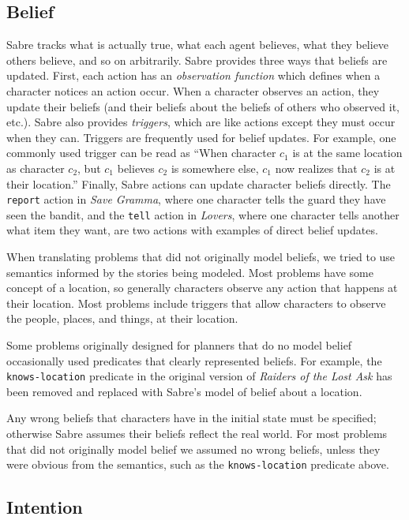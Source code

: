 \documentclass{nilreport}
\begin{document}
\subsection{Belief}

Sabre tracks what is actually true, what each agent believes, what
they believe others believe, and so on arbitrarily. Sabre provides
three ways that beliefs are updated. First, each action has an \emph{observation
function} which defines when a character notices an action occur.
When a character observes an action, they update their beliefs (and
their beliefs about the beliefs of others who observed it, etc.).
Sabre also provides \emph{triggers}, which are like actions except
they must occur when they can. Triggers are frequently used for belief
updates. For example, one commonly used trigger can be read as ``When
character $c_{1}$ is at the same location as character $c_{2}$,
but $c_{1}$ believes $c_{2}$ is somewhere else, $c_{1}$ now realizes
that $c_{2}$ is at their location.'' Finally, Sabre actions can
update character beliefs directly. The \texttt{report} action in \emph{Save
Gramma}, where one character tells the guard they have seen the bandit,
and the \texttt{tell} action in \emph{Lovers}, where one character
tells another what item they want, are two actions with examples of
direct belief updates.

When translating problems that did not originally model beliefs, we
tried to use semantics informed by the stories being modeled. Most
problems have some concept of a location, so generally characters
observe any action that happens at their location. Most problems include
triggers that allow characters to observe the people, places, and
things, at their location.

Some problems originally designed for planners that do no model belief
occasionally used predicates that clearly represented beliefs. For
example, the \texttt{knows-location} predicate in the original version
of \emph{Raiders of the Lost Ask} has been removed and replaced with
Sabre's model of belief about a location.

Any wrong beliefs that characters have in the initial state must be
specified; otherwise Sabre assumes their beliefs reflect the real
world. For most problems that did not originally model belief we assumed
no wrong beliefs, unless they were obvious from the semantics, such
as the \texttt{knows-location} predicate above.

\subsection{Intention}
\end{document}
